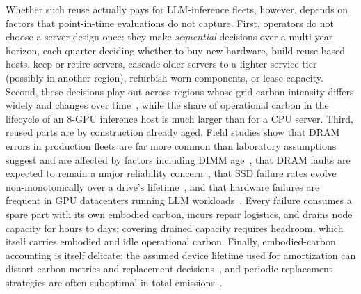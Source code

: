 \documentclass{article} %
\begin{document}
Whether such reuse actually pays for LLM-inference fleets, however, depends on factors that point-in-time evaluations do not capture. First, operators do not choose a server design once; they make \emph{sequential} decisions over a multi-year horizon, each quarter deciding whether to buy new hardware, build reuse-based hosts, keep or retire servers, cascade older servers to a lighter service tier (possibly in another region), refurbish worn components, or lease capacity. Second, these decisions play out across regions whose grid carbon intensity differs widely and changes over time~\citep{Wiesner2021LetsWait}, while the share of operational carbon in the lifecycle of an 8-GPU inference host is much larger than for a CPU server. Third, reused parts are by construction already aged. Field studies show that DRAM errors in production fleets are far more common than laboratory assumptions suggest and are affected by factors including DIMM age~\citep{Schroeder2009DramErrors}, that DRAM faults are expected to remain a major reliability concern~\citep{Sridharan2015MemoryErrors}, that SSD failure rates evolve non-monotonically over a drive's lifetime~\citep{Meza2015LargescaleFlash}, and that hardware failures are frequent in GPU datacenters running LLM workloads~\citep{Hu2024CharacterizationLarge}. Every failure consumes a spare part with its own embodied carbon, incurs repair logistics, and drains node capacity for hours to days; covering drained capacity requires headroom, which itself carries embodied and idle operational carbon. Finally, embodied-carbon accounting is itself delicate: the assumed device lifetime used for amortization can distort carbon metrics and replacement decisions~\citep{Huang2025CaseAccurate}, and periodic replacement strategies are often suboptimal in total emissions~\citep{Sharma2025TowardOptimal}.
\end{document}
